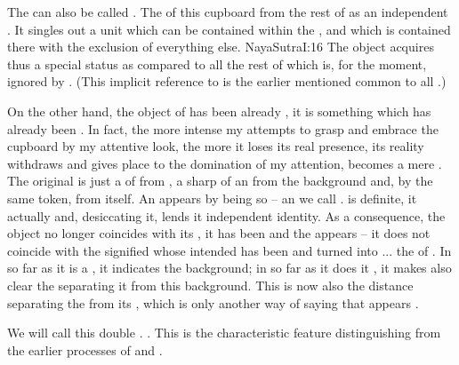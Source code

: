 \pa\label{pa:doubleSep}\label{pa:Rexternal}
The  can also be called .
The  of   this cupboard from the rest of
 as an independent .  It singles out a unit which can be
contained within the \hoa, and which is contained there with the exclusion of
everything else.  \citet{The mark of the mind is that there do not arise more
  acts of knowledge than one at a time.}{NayaSutra}{I:16} The
object acquires thus a special status as compared to all the rest of
 which is, for the moment, ignored by .  (This
implicit reference to  is the earlier mentioned
 common to all .)

On the other hand, the object of  has been already
, it is something which has already been .  In
fact, the more intense my attempts to grasp and embrace the cupboard by my
attentive look, the more it loses its real presence, its reality withdraws and
gives place to the domination of my  attention, becomes a mere
.  The original  is just a
 of  from , a sharp
 of an  from the background and, by the same token,
from itself.  An  appears by being so  -- an 
we call .  is definite, it actually
 and, desiccating it, lends it independent
identity. As a consequence, the object no longer coincides with its , it
has been  and the  appears  -- it does
not coincide with the signified whose intended  has been
 and turned into ... the  of .  In so
far as it is a , it indicates the background; in so far as it does it
, it makes also clear the  separating it from this
background. This  is now also the distance separating the
 from its ,
which is only another way of saying that  appears .

We will call this double  .
 . This is the characteristic feature
distinguishing  from the earlier processes of  and
.


